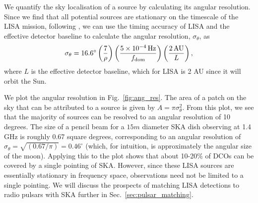 We quantify the sky localisation of a source by calculating its angular resolution. Since we find that all potential sources are stationary on the timescale of the LISA mission, following \citet{Mandel+2018}, we can use the timing accuracy of LISA and the effective detector baseline to calculate the angular resolution, $\sigma_{\theta}$, as
\begin{equation}
    \sigma_{\theta} = 16.6^\circ \left(\frac{7}{\rho}\right) \left(\frac{5 \times 10^{-4} \unit{Hz}}{f_{\rm dom}}\right) \left( \frac{2 \unit{AU}}{L} \right),
\end{equation}
where $L$ is the effective detector baseline, which for LISA is 2 AU since it will orbit the Sun.

We plot the angular resolution in Fig.~\ref{fig:ang_res}. The area of a patch on the sky that can be attributed to a source is given by $A = \pi \sigma_\theta^2$. From this plot, we see that the majority of sources can be resolved to an angular resolution of 10 degrees. The size of a pencil beam for a $15 \unit{m}$ diameter SKA dish observing at 1.4 GHz is roughly 0.67 square degrees, corresponding to an angular resolution of $\sigma_\theta = \sqrt{(0.67 / \pi)} = 0.46^\circ$ (which, for intuition, is approximately the angular size of the moon). Applying this to the plot shows that about 10-20\% of DCOs can be covered by a single pointing of SKA. However, since these LISA sources are essentially stationary in frequency space, observations need not be limited to a single pointing. We will discuss the prospects of matching LISA detections to radio pulsars with SKA further in Sec.~\ref{sec:pulsar_matching}.
